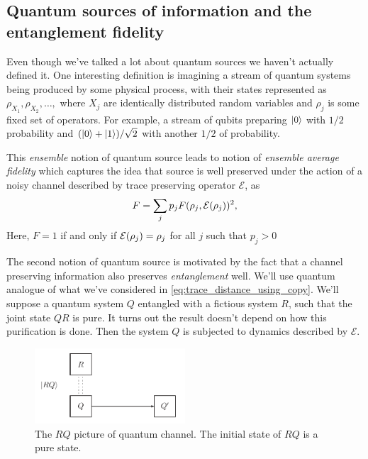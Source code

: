 \subsection{Quantum sources of information and the entanglement fidelity}
Even though we've talked a lot about quantum sources we haven't actually defined it. One interesting definition is imagining a stream of quantum systems being produced by some physical process, with their states represented as $\rho_{X_1}, \rho_{X_2}, \dots,$ where $X_j$ are identically distributed random variables and $\rho_j$ is some fixed set of operators. For example, a stream of qubits preparing $\ket{0}$ with $1/2$ probability and $(\ket{0}+\ket{1})/\sqrt{2}$ with another $1/2$ of probability.

This \textit{ensemble} notion of quantum source leads to notion of \textit{ensemble average fidelity} which captures the idea that source is well preserved under the action of a noisy channel described by trace preserving operator $\mathcal{E}$, as
\begin{equation}
    F = \sum_j p_j F(\rho_j, \operatorname{\mathcal{E}}(\rho_j))^2,
\end{equation}
Here, $F=1$ if and only if $\operatorname{\mathcal{E}}(\rho_j)=\rho_j$ for all $j$ such that $p_j>0$

The second notion of quantum source is motivated by the fact that a channel preserving information also preserves \textit{entanglement} well. We'll use quantum analogue of what we've considered in \ref{eq:trace_distance_using_copy}.
We'll suppose a quantum system $Q$ entangled with a fictious system $R$, such that the joint state $QR$ is pure. It turns out the result doesn't depend on how this purification is done. Then the system $Q$ is subjected to dynamics described by $\mathcal{E}$.

\begin{figure}[H]
    \centering
    \includegraphics[width=0.5\textwidth]{images/entanglement-fidelity.png}
    \caption{The $RQ$ picture of quantum channel. The initial state of $RQ$ is a pure state.}
    \label{fig:entanglement-fidelity}
\end{figure}

